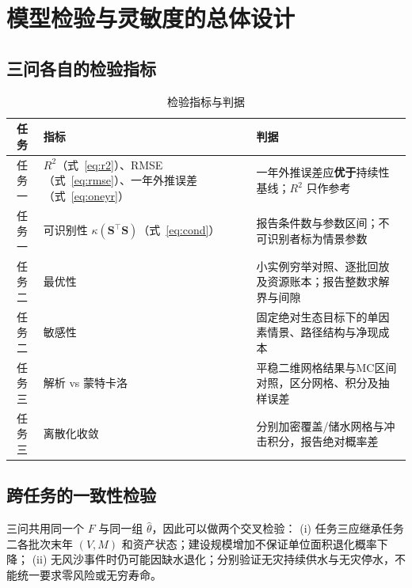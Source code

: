 \documentclass[11pt,a4paper]{ctexart}
\begin{document}




\section{模型检验与灵敏度的总体设计}\label{sec:check}

\subsection{三问各自的检验指标}

\begin{table}[H]\centering\small
\begin{tabularx}{\textwidth}{|c|X|X|}
\toprule
任务 & 指标 & 判据 \\
\midrule
任务一 & $R^2$（式~\eqref{eq:r2}）、RMSE（式~\eqref{eq:rmse}）、一年外推误差（式~\eqref{eq:oneyr}）
& 一年外推误差应\textbf{优于}持续性基线；$R^2$ 只作参考 \\
任务一 & 可识别性 $\kappa(\bm{S}^{\top}\bm{S})$（式~\eqref{eq:cond}）
& 报告条件数与参数区间；不可识别者标为情景参数 \\
任务二 & 最优性 & 小实例穷举对照、逐批回放及资源账本；报告整数求解界与间隙 \\
任务二 & 敏感性 & 固定绝对生态目标下的单因素情景、路径结构与净现成本 \\
任务三 & 解析 vs 蒙特卡洛 & 平稳二维网格结果与MC区间对照，区分网格、积分及抽样误差 \\
任务三 & 离散化收敛 & 分别加密覆盖/储水网格与冲击积分，报告绝对概率差 \\
\bottomrule
\end{tabularx}
\caption{检验指标与判据}\label{tab:check}
\end{table}

\subsection{跨任务的一致性检验}

三问共用同一个 $F$ 与同一组 $\hat\theta$，因此可以做两个交叉检验：
(i) 任务三应继承任务二各批次末年 $(V,M)$ 和资产状态；建设规模增加不保证单位面积退化概率下降；
(ii) 无风沙事件时仍可能因缺水退化；分别验证无灾持续供水与无灾停水，不能统一要求零风险或无穷寿命。
\end{document}
